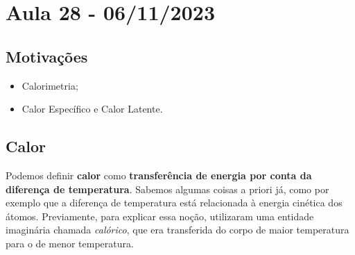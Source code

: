 \documentclass[PhysicsII/phsyicsII_notes.tex]{subfiles}
\begin{document}
\section{Aula 28 - 06/11/2023}
\subsection{Motivações}
\begin{itemize}
	\item Calorimetria;
	\item Calor Específico e Calor Latente.
\end{itemize}
\subsection{Calor}
Podemos definir \textbf{calor} como \textbf{transferência de energia por conta da diferença de temperatura}. Sabemos algumas coisas
a priori já, como por exemplo que a diferença de temperatura está relacionada à energia cinética dos átomos. Previamente,
para explicar essa noção, utilizaram uma entidade imaginária chamada \textit{calórico}, que era transferida do corpo de maior temperatura
para o de menor temperatura.
\end{document}

